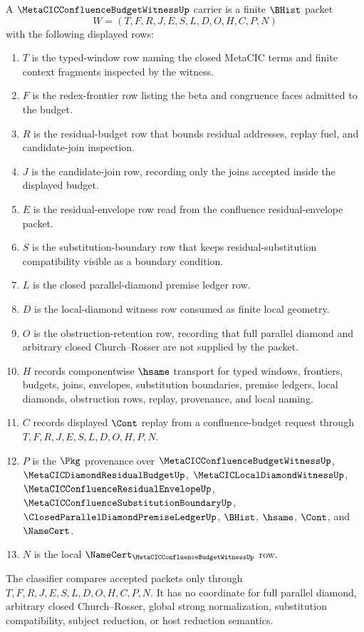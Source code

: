 \begin{definition}
\label{def:metacic-confluence-budget-witness-carrier}
A $\MetaCICConfluenceBudgetWitnessUp$ carrier is a finite $\BHist$ packet
$$
W=(T,F,R,J,E,S,L,D,O,H,C,P,N)
$$
with the following displayed rows:
\begin{enumerate}
\item $T$ is the typed-window row naming the closed MetaCIC terms and finite context fragments inspected by the witness.
\item $F$ is the redex-frontier row listing the beta and congruence faces admitted to the budget.
\item $R$ is the residual-budget row that bounds residual addresses, replay fuel, and candidate-join inspection.
\item $J$ is the candidate-join row, recording only the joins accepted inside the displayed budget.
\item $E$ is the residual-envelope row read from the confluence residual-envelope packet.
\item $S$ is the substitution-boundary row that keeps residual-substitution compatibility visible as a boundary condition.
\item $L$ is the closed parallel-diamond premise ledger row.
\item $D$ is the local-diamond witness row consumed as finite local geometry.
\item $O$ is the obstruction-retention row, recording that full parallel diamond and arbitrary closed Church--Rosser are not supplied by the packet.
\item $H$ records componentwise $\hsame$ transport for typed windows, frontiers, budgets, joins, envelopes, substitution boundaries, premise ledgers, local diamonds, obstruction rows, replay, provenance, and local naming.
\item $C$ records displayed $\Cont$ replay from a confluence-budget request through $T,F,R,J,E,S,L,D,O,H,P,N$.
\item $P$ is the $\Pkg$ provenance over $\MetaCICConfluenceBudgetWitnessUp$, $\MetaCICDiamondResidualBudgetUp$, $\MetaCICLocalDiamondWitnessUp$, $\MetaCICConfluenceResidualEnvelopeUp$, $\MetaCICConfluenceSubstitutionBoundaryUp$, $\ClosedParallelDiamondPremiseLedgerUp$, $\BHist$, $\hsame$, $\Cont$, and $\NameCert$.
\item $N$ is the local $\NameCert_{\MetaCICConfluenceBudgetWitnessUp}$ row.
\end{enumerate}
The classifier compares accepted packets only through $T,F,R,J,E,S,L,D,O,H,C,P,N$. It has no coordinate for full parallel diamond, arbitrary closed Church--Rosser, global strong normalization, substitution compatibility, subject reduction, or host reduction semantics.
\end{definition}

